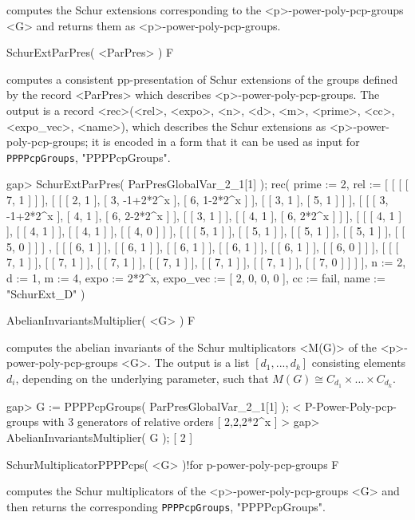 computes the Schur extensions corresponding to the <p>-power-poly-pcp-groups
<G> and returns them as <p>-power-poly-pcp-groups.

\>SchurExtParPres( <ParPres> ) F

computes a consistent pp-presentation of Schur extensions of the 
groups defined by the record <ParPres> which describes 
<p>-power-poly-pcp-groups. The output is a record 
<rec>(<rel>, <expo>, <n>, <d>, <m>, <prime>, <cc>, <expo\_vec>, <name>), 
which describes the Schur extensions as <p>-power-poly-pcp-groups; it is 
encoded in a form that it can be used as input for 
{\tt PPPPcpGroups},
"PPPPcpGroups".

\beginexample
gap> SchurExtParPres( ParPresGlobalVar_2_1[1] );
rec( prime := 2, 
  rel := [ [ [ [ 7, 1 ] ] ], [ [ [ 2, 1 ], [ 3, -1+2*2^x ], [ 6, 1-2*2^x ] ], 
          [ [ 3, 1 ], [ 5, 1 ] ] ], 
      [ [ [ 3, -1+2*2^x ], [ 4, 1 ], [ 6, 2-2*2^x ] ], [ [ 3, 1 ] ], 
          [ [ 4, 1 ], [ 6, 2*2^x ] ] ], 
      [ [ [ 4, 1 ] ], [ [ 4, 1 ] ], [ [ 4, 1 ] ], [ [ 4, 0 ] ] ], 
      [ [ [ 5, 1 ] ], [ [ 5, 1 ] ], [ [ 5, 1 ] ], [ [ 5, 1 ] ], [ [ 5, 0 ] ] ]
        , 
      [ [ [ 6, 1 ] ], [ [ 6, 1 ] ], [ [ 6, 1 ] ], [ [ 6, 1 ] ], [ [ 6, 1 ] ], 
          [ [ 6, 0 ] ] ], 
      [ [ [ 7, 1 ] ], [ [ 7, 1 ] ], [ [ 7, 1 ] ], [ [ 7, 1 ] ], [ [ 7, 1 ] ], 
          [ [ 7, 1 ] ], [ [ 7, 0 ] ] ] ], n := 2, d := 1, m := 4, 
  expo := 2*2^x, expo_vec := [ 2, 0, 0, 0 ], cc := fail, name := "SchurExt_D" 
 )
\endexample


\>AbelianInvariantsMultiplier( <G> ) F

computes the abelian invariants of the Schur multiplicators <M(G)> of the
<p>-power-poly-pcp-groups <G>. The output is a list $[d_1, ..., d_k]$
consisting elements $d_i$, depending on the underlying parameter, such that 
$M(G) \cong C_{d_1} \times \ldots \times C_{d_k}$.

\beginexample
gap> G := PPPPcpGroups( ParPresGlobalVar_2_1[1] );
< P-Power-Poly-pcp-groups with 3 generators of relative orders [ 2,2,2*2^x ] >
gap> AbelianInvariantsMultiplier( G );
[ 2 ]
\endexample

\>SchurMultiplicatorPPPPcps( <G> )!{for p-power-poly-pcp-groups} F

computes the Schur multiplicators of the <p>-power-poly-pcp-groups <G> and 
then returns the corresponding 
{\tt PPPPcpGroups},
"PPPPcpGroups".

